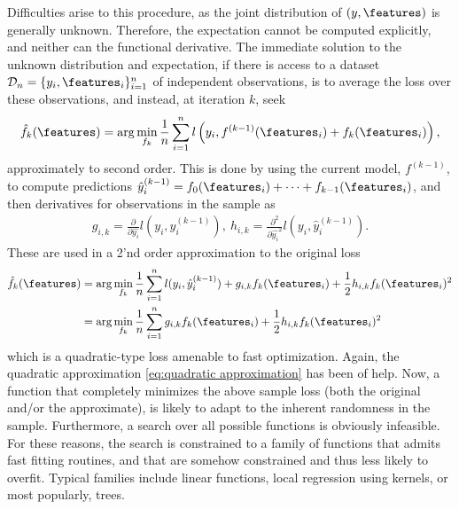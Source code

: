 Difficulties arise to this procedure, as the joint distribution of $(y,\features)$ is generally unknown. Therefore, the expectation cannot be computed explicitly, and neither can the functional derivative.
The immediate solution to the unknown distribution and expectation, if there is access to a dataset $\mathcal{D}_n=\{y_i,\features_i\}_{i=1}^n$ of independent observations, is to average the loss over these observations, and instead, at iteration $k$, seek
\begin{align}
	\hat{f}_k(\features) = \arg\min_{f_k} \frac{1}{n}\sum_{i=1}^{n} l\left( y_i, f^{(k-1)}(\features_i)+f_k(\features_i) \right),
\end{align}
approximately to second order.
This is done by using the current model, $f^{(k-1)}$, to compute predictions $\hat{y}_i^{(k-1)}=f_0(\features_i)+\dots+f_{k-1}(\features_i)$, and then derivatives for observations in the sample as 
\begin{align}\label{eq:gb-derivatives}
g_{i,k} = \frac{\partial}{\partial \hat{y_i}}l(y_i,\hat{y}_i^{(k-1)})
,~
h_{i,k} = \frac{\partial^2}{\partial \hat{y_i}^2}l(y_i,\hat{y}_i^{(k-1)}).
\end{align}
These are used in a 2'nd order approximation to the original loss
\begin{align}\label{eq:gb-iteration-loss}
	\hat{f}_k(\features) &= \arg\min_{f_k}
	\frac{1}{n}\sum_{i=1}^{n}l(y_i,\hat{y}_i^{(k-1)}) + g_{i,k}f_k(\features_i) + \frac{1}{2}h_{i,k}f_k(\features_i)^2
	\notag \\
	&= \arg\min_{f_k} \frac{1}{n}\sum_{i=1}^{n} g_{i,k}f_k(\features_i) + \frac{1}{2}h_{i,k}f_k(\features_i)^2
\end{align}
which is a quadratic-type loss amenable to fast optimization.
Again, the quadratic approximation \eqref{eq:quadratic approximation} has been of help.
Now, a function that completely minimizes the above sample loss (both the original and/or the approximate), is likely to adapt to the inherent randomness in the sample.
Furthermore, a search over all possible functions is obviously infeasible.
For these reasons, the search is constrained to a family of functions that admits fast fitting routines, and that are somehow constrained and thus less likely to overfit.
Typical families include linear functions, local regression using kernels, or most popularly, trees.

